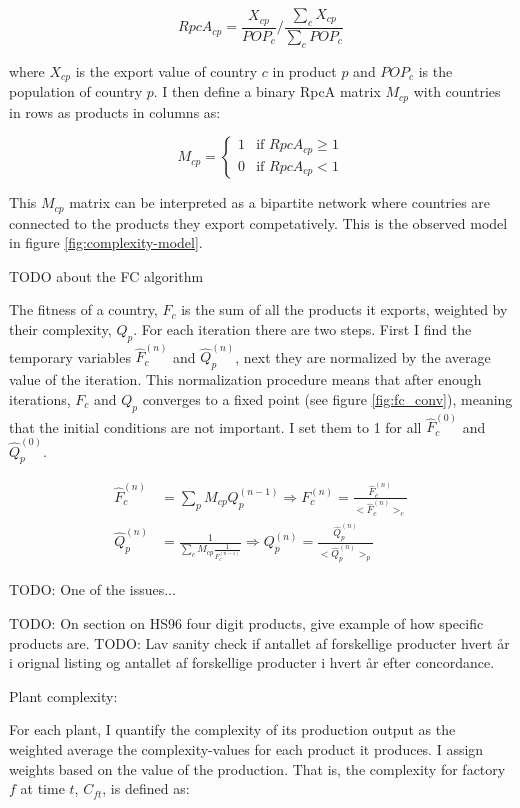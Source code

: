 \documentclass[11pt]{article}
\begin{document}
\[
	RpcA_{cp} = \frac{X_{cp}}{POP_{c}} \bigg / \frac{\sum_c X_{cp}}{\sum_c POP_c}
\]

where \(X_{cp}\) is the export value of country \(c\) in product \(p\) and \(POP_{c}\) is the population of country \(p\). I then define a binary RpcA matrix \(M_{cp}\) with countries in rows as products in columns as:

\[
M_{cp} = \begin{cases}
 1 & \text{if } RpcA_{cp} \geq 1 \\
 0 & \text{if } RpcA_{cp} < 1
\end{cases}
\]

This \(M_{cp}\) matrix can be interpreted as a bipartite network where countries are connected to the products they export competatively. This is the observed model in figure \ref{fig:complexity-model}. 

TODO about the FC algorithm 

The fitness of a country, \(F_{c}\) is the sum of all the products it exports, weighted by their complexity, \(Q_{p}\). For each iteration there are two steps. First I find the temporary variables \(\hat{F}^{(n)}_{c}\) and \(\hat{Q}^{(n)}_{p}\), next they are normalized by the average value of the iteration. This normalization procedure means that after enough iterations, \(F_{c}\) and \(Q_{p}\) converges to a fixed point (see figure \ref{fig:fc_conv}), meaning that the initial conditions are not important. I set them to 1 for all \(\hat{F}^{(0)}_{c}\) and \(\hat{Q}^{(0)}_{p}\).

 \[
	 \begin{split}
		 \hat{F}^{(n)}_{c} &= \sum_p M_{cp} Q^{(n-1)}_{p} \Rightarrow F^{(n)}_{c} = \frac{\hat{F}^{(n)}_{c}}{\bigg < \hat{F}^{(n)}_c \bigg > _c} \\
		 \hat{Q}^{(n)}_{p} &= \frac{1}{\sum_c M_{cp} \frac{1}{F^{(n-1)}_c}} \Rightarrow Q^{(n)}_{p} = \frac{\hat{Q}^{(n)}_{p}}{\bigg < \hat{Q}^{(n)}_p \bigg > _p }
	 \end{split}
\]

TODO: One of the issues...

TODO: On section on HS96 four digit products, give example of how specific products are.
TODO: Lav sanity check if antallet af forskellige producter hvert år i orignal listing og antallet af forskellige producter i hvert år efter concordance.


Plant complexity:

For each plant, I quantify the complexity of its production output as the weighted average the complexity-values for each product it produces. I assign weights based on the value of the production. That is, the complexity for factory \(f\) at time \(t\), \(C_{ft}\), is defined as:
\end{document}
